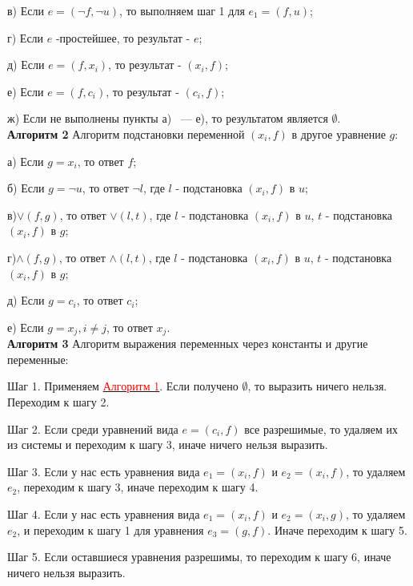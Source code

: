 \documentclass[12pt]{article}
\begin{document}
     в) Если $e=(\neg f,\neg u)$, то выполняем шаг 1 для $e_{1}=(f,u)$;
     
     г) Если $e$ -простейшее, то результат - $e$;
     
     д) Если $e=(f,x_{i})$, то результат - $(x_{i}, f)$; 
     
     е) Если $e=(f,c_{i})$, то результат - $(c_{i}, f)$; 
     
     ж) Если не выполнены пункты а) ~--- \; е), то результатом является $  \emptyset $.
     \\ 
     
    \hypertarget{a2}{{\bf Алгоритм 2}} Алгоритм подстановки переменной $ (x_{i},f) $ в другое уравнение $g$: 
    
    
    а) Если $g = x_{i}$, то ответ  $f$;
    
    б) Если $g = \neg{u}$, то ответ $\neg{l}$, где $l$ - подстановка $ (x_{i},f) $ в $u$;
    
    в)$\vee (f, g)$, то ответ $\vee(l,t)$, где $l$ - подстановка $ (x_{i},f) $ в $u$,  $t$ - подстановка $ (x_{i},f) $ в $g$;
    
    г)$\wedge (f, g)$, то ответ $\wedge(l,t)$, где $l$ - подстановка $ (x_{i},f) $ в $u$, $t$ - подстановка $ (x_{i},f) $ в $g$;
    
    д) Если $g = c_{i}$, то ответ $c_{i}$;
    
    е) Если $g = x_{j}, i \neq j$, то ответ $x_{j}$.
     \\
     
      \hypertarget{a3}{{\bf Алгоритм 3}} Алгоритм выражения переменных через константы и другие переменные:
     
     Шаг 1. Применяем \hyperlink{a1}{ \textcolor{red} {Алгоритм 1}}. Если получено $\emptyset$, то выразить ничего нельзя. Переходим к шагу 2.
     
     Шаг 2. Если среди уравнений вида $e =(c_{i},f)$ все разрешимые, то удаляем  их из системы и переходим к шагу 3, иначе ничего нельзя выразить.
     
     Шаг 3. Если у нас есть уравнения вида $e_{1} =(x_{i},f)$ и $e_{2} =(x_{i},f)$, то удаляем $e_{2}$, переходим к шагу 3, иначе переходим к шагу 4.
     
     Шаг 4. Если у нас есть уравнения вида $e_{1} =(x_{i},f)$ и $e_{2} =(x_{i},g)$, то удаляем $e_{2}$, и переходим к  шагу 1 для  уравнения   $e_{3} =(g,f)$. Иначе переходим к шагу 5.
     
     Шаг 5. Если оставшиеся уравнения разрешимы, то переходим к шагу 6, иначе ничего нельзя выразить.
     
\end{document}
